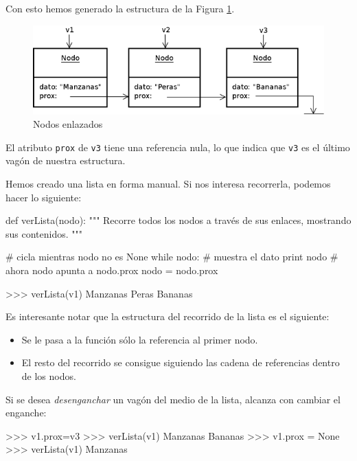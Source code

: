 Con esto hemos generado la estructura de la Figura \ref{nodos}.

\begin{figure}[htb]
\label{nodos}
\includegraphics{graficos/16_Nodos}
\caption{Nodos enlazados}
\end{figure}

El atributo \lstinline!prox! de \lstinline!v3! tiene una referencia nula,
lo que indica que \lstinline!v3! es el último vagón de nuestra estructura.

Hemos creado una lista en forma manual. Si nos interesa recorrerla, podemos
hacer lo siguiente:

\begin{codigo-python-sn}
def verLista(nodo):
    """ Recorre todos los nodos a través de sus enlaces,
        mostrando sus contenidos. """

    # cicla mientras nodo no es None
    while nodo:
        # muestra el dato
        print nodo
        # ahora nodo apunta a nodo.prox
        nodo = nodo.prox
\end{codigo-python-sn}

\begin{codigo-python-sn}
>>> verLista(v1)
Manzanas
Peras
Bananas
\end{codigo-python-sn}

Es interesante notar que la estructura del recorrido de la lista es el
siguiente:

\begin{itemize}
\item Se le pasa a la función sólo la referencia al primer nodo.

\item El resto del recorrido se consigue siguiendo las cadena de
referencias dentro de los nodos.
\end{itemize}

Si se desea {\it desenganchar} un vagón del medio de la lista, alcanza con
cambiar el enganche:

\begin{codigo-python-sn}
>>> v1.prox=v3
>>> verLista(v1)
Manzanas
Bananas
>>> v1.prox = None
>>> verLista(v1)
Manzanas
\end{codigo-python-sn}

